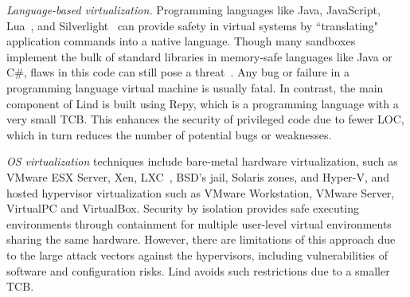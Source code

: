 {\textit{Language-based virtualization.}
Programming languages like Java, JavaScript, Lua~\cite{Lua}, and
Silverlight~\cite{Silverlight} can provide safety in virtual systems by
``translating" application commands into a native language.
%
Though many sandboxes implement the bulk of standard libraries in
memory-safe languages like Java or C\#, flaws in this code can
still pose a threat~\cite{JavaBugs, Java-Lessons}.
Any bug or failure in a programming language virtual
machine is usually fatal. In contrast, the main component of Lind
is built using Repy, which is a programming language with a very small TCB.
This enhances the security of privileged code due to fewer LOC,  which in
turn reduces the number of potential bugs or weaknesses.

\textit{OS virtualization}
techniques include
bare-metal hardware virtualization, such as VMware ESX Server, Xen,
LXC~\cite{LXC}, BSD's jail, Solaris zones, and Hyper-V, and
hosted hypervisor virtualization such as VMware
Workstation, VMware Server, VirtualPC and VirtualBox.
Security by isolation \cite{Qubes, Overshadow, SecureVM, HypSec}
provides safe executing environments through containment for multiple
user-level virtual environments sharing the same hardware.
However, there are limitations of this approach due to
the large attack vectors against the hypervisors, including
vulnerabilities of software and configuration risks. Lind avoids such restrictions due to a smaller TCB.

}
